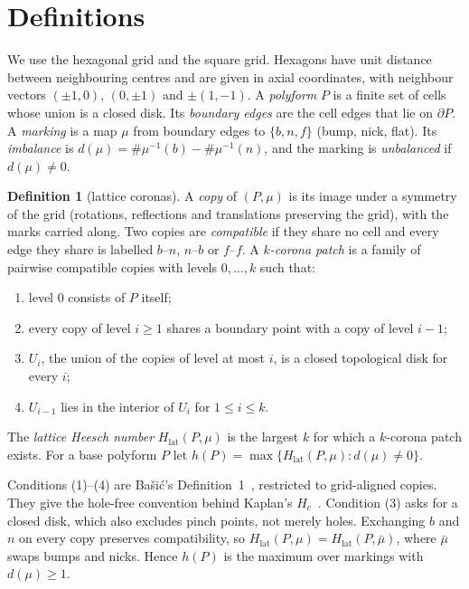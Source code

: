 \documentclass[11pt]{amsart}
\theoremstyle{definition}
\newtheorem{definition}[theorem]{Definition}
\theoremstyle{remark}
\newcommand{\Hl}{H_{\mathrm{lat}}}
\begin{document}
\section{Definitions}\label{sec:defs}

We use the hexagonal grid and the square grid. Hexagons have unit distance between neighbouring centres and are given in axial coordinates, with neighbour vectors $(\pm1,0)$, $(0,\pm1)$ and $\pm(1,-1)$. A \emph{polyform} $P$ is a finite set of cells whose union is a closed disk. Its \emph{boundary edges} are the cell edges that lie on $\partial P$. A \emph{marking} is a map $\mu$ from boundary edges to $\{b,n,f\}$ (bump, nick, flat). Its \emph{imbalance} is $d(\mu)=\#\mu^{-1}(b)-\#\mu^{-1}(n)$, and the marking is \emph{unbalanced} if $d(\mu)\ne0$.

\begin{definition}[lattice coronas]\label{def:lattice}
A \emph{copy} of $(P,\mu)$ is its image under a symmetry of the grid (rotations, reflections and translations preserving the grid), with the marks carried along. Two copies are \emph{compatible} if they share no cell and every edge they share is labelled $b$--$n$, $n$--$b$ or $f$--$f$. A \emph{$k$-corona patch} is a family of pairwise compatible copies with levels $0,\dots,k$ such that:
\begin{enumerate}
\item level $0$ consists of $P$ itself;
\item every copy of level $i\ge1$ shares a boundary point with a copy of level $i-1$;
\item $U_i$, the union of the copies of level at most $i$, is a closed topological disk for every $i$;
\item $U_{i-1}$ lies in the interior of $U_i$ for $1\le i\le k$.
\end{enumerate}
The \emph{lattice Heesch number} $\Hl(P,\mu)$ is the largest $k$ for which a $k$-corona patch exists. For a base polyform $P$ let $h(P)=\max\{\Hl(P,\mu): d(\mu)\neq0\}$.
\end{definition}

Conditions (1)--(4) are Ba\v{s}i\'c's Definition~1~\cite{Basic2021}, restricted to grid-aligned copies. They give the hole-free convention behind Kaplan's $H_c$~\cite{Kaplan2022}. Condition (3) asks for a closed disk, which also excludes pinch points, not merely holes. Exchanging $b$ and $n$ on every copy preserves compatibility, so $\Hl(P,\mu)=\Hl(P,\bar\mu)$, where $\bar\mu$ swaps bumps and nicks. Hence $h(P)$ is the maximum over markings with $d(\mu)\ge1$.
\end{document}
